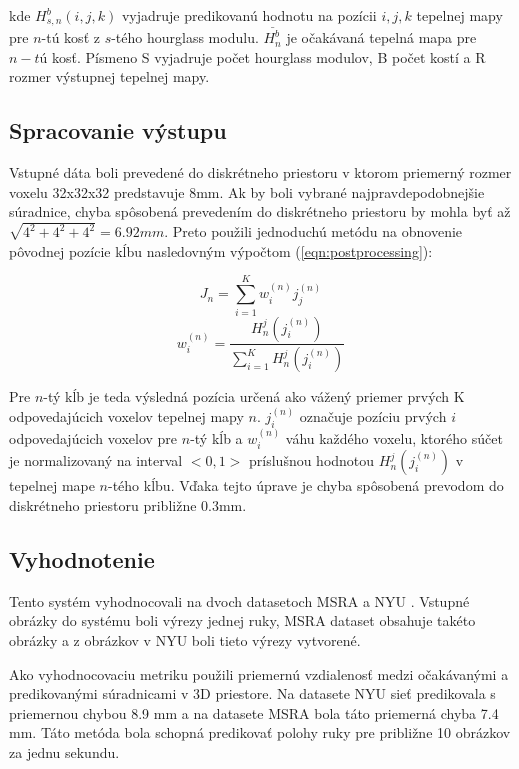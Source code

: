 kde $H_{s,n}^b(i,j,k)$ vyjadruje predikovanú hodnotu na pozícii $i,j,k$ tepelnej mapy pre $n$-tú kosť z $s$-tého hourglass modulu. $\overset{\_}{H_n^b}$ je očakávaná tepelná mapa pre $n-tú$ kosť. Písmeno S vyjadruje počet hourglass modulov, B počet kostí a R rozmer výstupnej tepelnej mapy.

\subsection{Spracovanie výstupu}
Vstupné dáta boli prevedené do diskrétneho priestoru v ktorom priemerný rozmer voxelu 32x32x32 predstavuje 8mm. Ak by boli vybrané najpravdepodobnejšie súradnice, chyba spôsobená prevedením do diskrétneho priestoru by mohla byť až $\sqrt{4^2+4^2+4^2} = 6.92mm$. Preto použili jednoduchú metódu na obnovenie pôvodnej pozície kĺbu nasledovným výpočtom (\ref{eqn:postprocessing}):

\begin{equation}\label{eqn:postprocessing}
    J_n = \sum_{i=1}^K{w_i^{(n)}}j_j^{(n)}
\end{equation}
\begin{equation}
    w_i^{(n)} = \frac{H_n^j(j_i^{(n)})}{\sum_{i=1}^{K}{H_n^j({j_i^{(n)}})}}
\end{equation}

Pre $n$-tý kĺb je teda výsledná pozícia určená ako vážený priemer prvých K odpovedajúcich voxelov tepelnej mapy $n$. $j_i^{(n)}$ označuje pozíciu prvých $i$ odpovedajúcich voxelov pre $n$-tý kĺb a $w_i^{(n)}$ váhu každého voxelu, ktorého súčet je normalizovaný na interval $<0,1>$ príslušnou hodnotou $H_n^j(j_i^{(n)})$ v tepelnej mape $n$-tého kĺbu. Vďaka tejto úprave je chyba spôsobená prevodom do diskrétneho priestoru približne 0.3mm.

\subsection{Vyhodnotenie}
Tento systém vyhodnocovali na dvoch datasetoch MSRA \cite{Sun_2015_CVPR} a NYU \cite{tompson14tog}. Vstupné obrázky do systému boli výrezy jednej ruky, MSRA dataset obsahuje takéto obrázky a z obrázkov v NYU boli tieto výrezy vytvorené. 

Ako vyhodnocovaciu metriku použili priemernú vzdialenosť medzi očakávanými a predikovanými súradnicami v 3D priestore. Na datasete NYU sieť predikovala s priemernou chybou 8.9 mm a na datasete MSRA bola táto priemerná chyba 7.4 mm. Táto metóda bola schopná predikovať polohy ruky pre približne 10 obrázkov za jednu sekundu.

